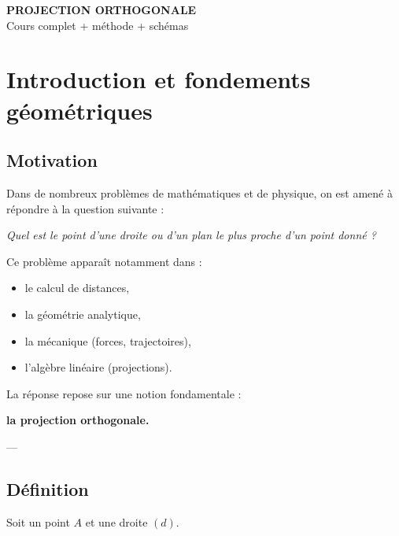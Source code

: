 \documentclass[11pt,a4paper]{article}
\begin{document}
\begin{center}
\Huge \textbf{PROJECTION ORTHOGONALE}\\
\Large Cours complet + méthode + schémas
\end{center}

\section{Introduction et fondements géométriques}

\subsection{Motivation}

Dans de nombreux problèmes de mathématiques et de physique, on est amené à répondre à la question suivante :

\begin{center}
\textit{Quel est le point d’une droite ou d’un plan le plus proche d’un point donné ?}
\end{center}

\bigskip

Ce problème apparaît notamment dans :
\begin{itemize}
\item le calcul de distances,
\item la géométrie analytique,
\item la mécanique (forces, trajectoires),
\item l’algèbre linéaire (projections).
\end{itemize}

\bigskip

La réponse repose sur une notion fondamentale :

\begin{center}
\Large \textbf{la projection orthogonale.}
\end{center}

---

\subsection{Définition}

Soit un point $A$ et une droite $(d)$.

\bigskip
\end{document}
